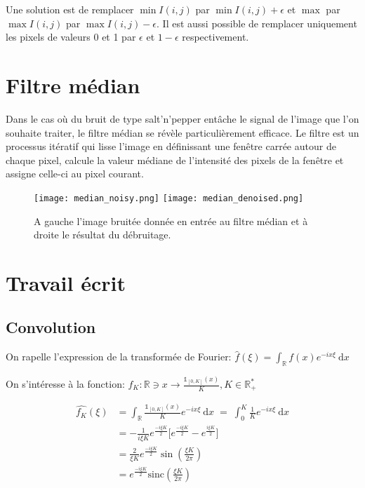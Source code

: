 \documentclass{article}
\begin{document}
Une solution est de remplacer $\min I(i,j)$ par $\min I(i,j) + \epsilon$ et $\max$ par $\max I(i,j)$ par $\max I(i,j) - \epsilon$.
Il est aussi possible de remplacer uniquement les pixels de valeurs 0 et 1 par $\epsilon$ et $1-\epsilon$ respectivement.


\section{Filtre médian}
	Dans le cas où du bruit de type salt'n'pepper entâche le signal de l'image que l'on souhaite traiter, le filtre médian se révèle particulièrement efficace. Le filtre est un processus itératif qui lisse l'image en définissant une fenêtre carrée autour de chaque pixel,  calcule la valeur médiane de l'intensité des pixels de la fenêtre et assigne celle-ci au pixel courant.
	
\begin{figure}[h]

	\texttt{[image: median\_noisy.png]}
	\texttt{[image: median\_denoised.png]}
	\caption{A gauche l'image bruitée donnée en entrée au filtre médian et à droite le résultat du débruitage.}
	
\end{figure}
\newpage
\section{Travail écrit}

\subsection{Convolution}
On rapelle l'expression de la transformée de Fourier:
$ \hat{f}(\xi) = \int_\mathbb{R} f(x) e^{-ix\xi} \:\mathrm{d}x$

On s'intéresse à la fonction: $ f_K : \mathbb{R} \ni x \rightarrow \frac{\mathds{1}_{[0, K]}(x)}{K}, K \in \mathbb{R}_+^* $

\begin{equation*}\begin{split}
\hat{f_K}(\xi) 
&= \int_\mathbb{R} \frac{\mathds{1}_{[0, K]}(x)}{K} e^{-ix\xi} \:\mathrm{d}x \;=\; \int_0^{K} \frac{1}{K}e^{-ix\xi}\:\mathrm{d} x \\
&= -\frac{1}{i \xi K} e^{\frac{-i \xi K}{2}}\bigg [ e^{\frac{-i \xi K}{2}} - e^{\frac{i \xi K}{2}} \bigg] \\
&= \frac{2}{\xi K} e^{\frac{-i \xi K}{2}} \sin(\frac{\xi K}{2\pi})\\
&= e^{\frac{-i \xi K}{2}} \text{sinc}(\frac{\xi K}{2\pi})
\end{split}\end{equation*}
\end{document}

